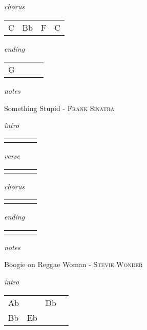 \documentclass[12pt]{article}
\begin{document}
\textit{chorus}

\begin{tabular}{|P{1.25in}|P{1.25in}|P{1.25in}|P{1.25in}|}
  C & Bb  & F  &  C  \\
\end{tabular}

\textit{ending}

\begin{tabular}{|P{1.25in}|P{1.25in}|P{1.25in}|P{1.25in}|}
  G &   &   &   \\
\end{tabular}

\textit{notes}

\newpage

{\Huge Something Stupid} {\huge - \textsc{Frank Sinatra}}

\huge
\textit{intro}

\begin{tabular}{|P{1.25in}|P{1.25in}|P{1.25in}|P{1.25in}|}
    &   &   &   \\
\end{tabular}

\textit{verse}

\begin{tabular}{|P{1.25in}|P{1.25in}|P{1.25in}|P{1.25in}|}
    &   &   &   \\
\end{tabular}

\textit{chorus}

\begin{tabular}{|P{1.25in}|P{1.25in}|P{1.25in}|P{1.25in}|}
    &   &   &   \\
\end{tabular}

\textit{ending}

\begin{tabular}{|P{1.25in}|P{1.25in}|P{1.25in}|P{1.25in}|}
    &   &   &   \\
\end{tabular}

\textit{notes}

\newpage

{\Huge Boogie on Reggae Woman} {\huge - \textsc{Stevie Wonder}}

\huge
\textit{intro}

\begin{tabular}{|P{1.25in}|P{1.25in}|P{1.25in}|P{1.25in}|}
  Ab &     & Db  &   \\
  Bb & Eb  &
\end{tabular}
\end{document}
